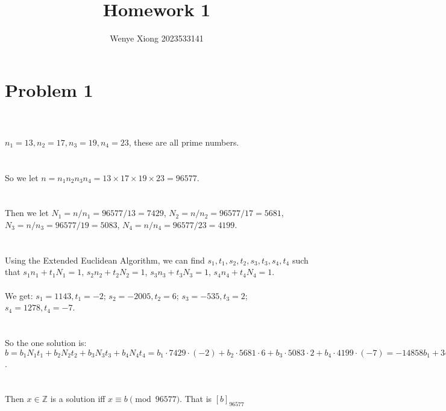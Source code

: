 \documentclass{article}
\author{Wenye Xiong 2023533141}
\title{Homework 1}
\begin{document}
\maketitle
\section{Problem 1}
\\ \hspace*{\fill} \\
$n_1 = 13, n_2 = 17, n_3 = 19, n_4 = 23$, these are all prime numbers.\\
\\ \hspace*{\fill} \\
So we let $n = n_1n_2n_3n_4 = 13\times17\times19\times23 = 96577$.\\
\\ \hspace*{\fill} \\
Then we let $N_1 = n/n_1 = 96577/13 = 7429$, $N_2 = n/n_2 = 96577/17 = 5681$, $N_3 = n/n_3 = 96577/19 = 5083$, $N_4 = n/n_4 = 96577/23 = 4199$.\\
\\ \hspace*{\fill} \\
Using the Extended Euclidean Algorithm, we can find $s_1, t_1, s_2, t_2, s_3, t_3, s_4, t_4$ such that $s_1n_1+t_1N_1 = 1$, $s_2n_2+t_2N_2 = 1$, $s_3n_3+t_3N_3 = 1$, $s_4n_4+t_4N_4 = 1$.\\
\\We get: $s_1 = 1143, t_1 = -2$; $s_2 = -2005, t_2 = 6$; $s_3 = -535, t_3 = 2$; $s_4 = 1278, t_4 = -7$.\\
\\ \hspace*{\fill} \\
So the one solution is:\\
$b = b_1N_1t_1 + b_2N_2t_2 + b_3N_3t_3 + b_4N_4t_4 = b_1\cdot7429\cdot(-2) + b_2\cdot5681\cdot6 + b_3\cdot5083\cdot2 + b_4\cdot4199\cdot(-7) = -14858b_1 + 34086b_2 + 10166b_3 - 29393b_4$.\\
\\ \hspace*{\fill} \\
Then $ x \in \mathbb{Z}$ is a solution iff $x \equiv b \pmod {96577}$. That is $[b]_{96577}$\\
\\ \hspace*{\fill} \\
\newpage
\end{document}
